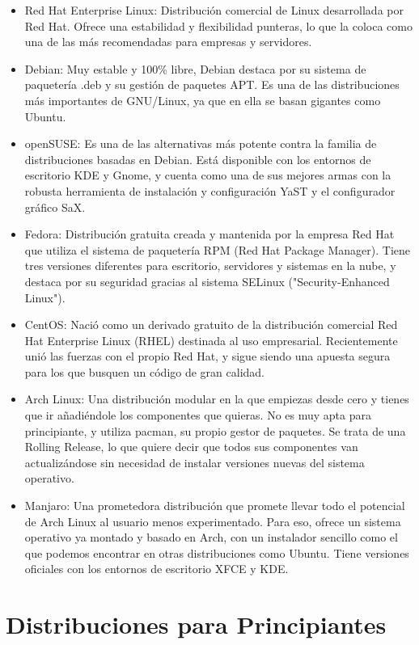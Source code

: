 \documentclass[11pt, a4paper]{report}
\begin{document}
\begin{itemize}
\item Red Hat Enterprise Linux: Distribución comercial de Linux desarrollada
  por Red Hat. Ofrece una estabilidad y flexibilidad punteras, lo que la coloca
  como una de las más recomendadas para empresas y servidores.
\item Debian: Muy estable y 100\% libre, Debian destaca por su sistema de
  paquetería .deb y su gestión de paquetes APT. Es una de las distribuciones
  más importantes de GNU/Linux, ya que en ella se basan gigantes como Ubuntu.
\item openSUSE: Es una de las alternativas más potente contra la familia de
  distribuciones basadas en Debian. Está disponible con los entornos de
  escritorio KDE y Gnome, y cuenta como una de sus mejores armas con la robusta
  herramienta de instalación y configuración YaST y el configurador gráfico SaX.
\item Fedora: Distribución gratuita creada y mantenida por la empresa Red Hat
  que utiliza el sistema de paquetería RPM (Red Hat Package Manager). Tiene
  tres versiones diferentes para escritorio, servidores y sistemas en la nube,
  y destaca por su seguridad gracias al sistema SELinux ("Security-Enhanced
  Linux").
\item CentOS: Nació como un derivado gratuito de la distribución comercial Red
  Hat Enterprise Linux (RHEL) destinada al uso empresarial. Recientemente unió
  las fuerzas con el propio Red Hat, y sigue siendo una apuesta segura para los
  que busquen un código de gran calidad.
\item Arch Linux: Una distribución modular en la que empiezas desde cero y
  tienes que ir añadiéndole los componentes que quieras. No es muy apta para
  principiante, y utiliza pacman, su propio gestor de paquetes. Se trata de una
  Rolling Release, lo que quiere decir que todos sus componentes van
  actualizándose sin necesidad de instalar versiones nuevas del sistema
  operativo.
\item Manjaro: Una prometedora distribución que promete llevar todo el
  potencial de Arch Linux al usuario menos experimentado. Para eso, ofrece un
  sistema operativo ya montado y basado en Arch, con un instalador sencillo
  como el que podemos encontrar en otras distribuciones como Ubuntu. Tiene
  versiones oficiales con los entornos de escritorio XFCE y KDE.
\end{itemize}

\section*{Distribuciones para Principiantes}
\end{document}
